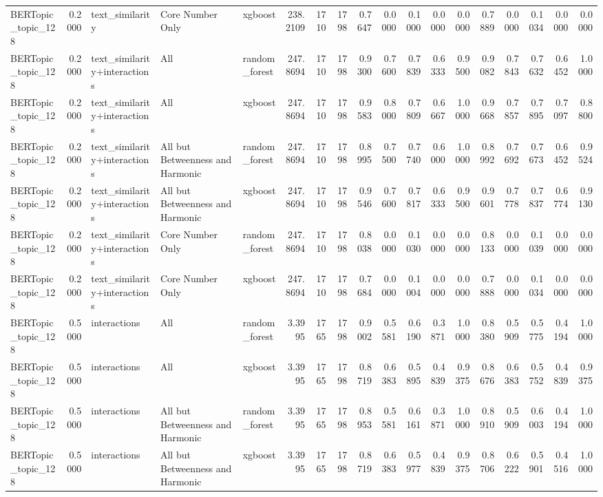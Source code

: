 \begin{tabular}{lrlllrrrrrrrrrrrrr}
BERTopic_topic_128 & 0.2000 & text_similarity & Core Number Only & xgboost & 238.2109 & 1710 & 1798 & 0.7647 & 0.0000 & 0.1000 & 0.0000 & 0.0000 & 0.7889 & 0.0000 & 0.1034 & 0.0000 & 0.0000 \\
BERTopic_topic_128 & 0.2000 & text_similarity+interactions & All & random_forest & 247.8694 & 1710 & 1798 & 0.9300 & 0.7600 & 0.7839 & 0.6333 & 0.9500 & 0.9082 & 0.7843 & 0.7632 & 0.6452 & 1.0000 \\
BERTopic_topic_128 & 0.2000 & text_similarity+interactions & All & xgboost & 247.8694 & 1710 & 1798 & 0.9583 & 0.8000 & 0.7809 & 0.6667 & 1.0000 & 0.9668 & 0.7857 & 0.7895 & 0.7097 & 0.8800 \\
BERTopic_topic_128 & 0.2000 & text_similarity+interactions & All but Betweenness and Harmonic & random_forest & 247.8694 & 1710 & 1798 & 0.8995 & 0.7500 & 0.7740 & 0.6000 & 1.0000 & 0.8992 & 0.7692 & 0.7673 & 0.6452 & 0.9524 \\
BERTopic_topic_128 & 0.2000 & text_similarity+interactions & All but Betweenness and Harmonic & xgboost & 247.8694 & 1710 & 1798 & 0.9546 & 0.7600 & 0.7817 & 0.6333 & 0.9500 & 0.9601 & 0.7778 & 0.7837 & 0.6774 & 0.9130 \\
BERTopic_topic_128 & 0.2000 & text_similarity+interactions & Core Number Only & random_forest & 247.8694 & 1710 & 1798 & 0.8038 & 0.0000 & 0.1030 & 0.0000 & 0.0000 & 0.8133 & 0.0000 & 0.1039 & 0.0000 & 0.0000 \\
BERTopic_topic_128 & 0.2000 & text_similarity+interactions & Core Number Only & xgboost & 247.8694 & 1710 & 1798 & 0.7684 & 0.0000 & 0.1004 & 0.0000 & 0.0000 & 0.7888 & 0.0000 & 0.1034 & 0.0000 & 0.0000 \\
BERTopic_topic_128 & 0.5000 & interactions & All & random_forest & 3.3995 & 1765 & 1798 & 0.9002 & 0.5581 & 0.6190 & 0.3871 & 1.0000 & 0.8380 & 0.5909 & 0.5775 & 0.4194 & 1.0000 \\
BERTopic_topic_128 & 0.5000 & interactions & All & xgboost & 3.3995 & 1765 & 1798 & 0.8719 & 0.6383 & 0.5895 & 0.4839 & 0.9375 & 0.8676 & 0.6383 & 0.5752 & 0.4839 & 0.9375 \\
BERTopic_topic_128 & 0.5000 & interactions & All but Betweenness and Harmonic & random_forest & 3.3995 & 1765 & 1798 & 0.8953 & 0.5581 & 0.6161 & 0.3871 & 1.0000 & 0.8910 & 0.5909 & 0.6003 & 0.4194 & 1.0000 \\
BERTopic_topic_128 & 0.5000 & interactions & All but Betweenness and Harmonic & xgboost & 3.3995 & 1765 & 1798 & 0.8719 & 0.6383 & 0.5977 & 0.4839 & 0.9375 & 0.8706 & 0.6222 & 0.5901 & 0.4516 & 1.0000 \\

\end{tabular}
